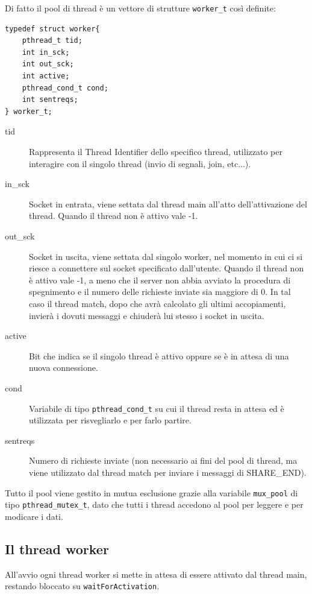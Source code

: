\documentclass[a4paper,10pt]{article}
\begin{document}
Di fatto il pool di thread \`e un vettore di strutture \texttt{worker\_t} cos\`i definite:
\begin{verbatim}
typedef struct worker{
    pthread_t tid;
    int in_sck;
    int out_sck;
    int active;
    pthread_cond_t cond;
    int sentreqs;
} worker_t;
\end{verbatim}

\begin{description}
	\item[tid] Rappresenta il Thread Identifier dello specifico thread, utilizzato per interagire con il singolo thread (invio di segnali, join, etc...).
	\item[in\_sck] Socket in entrata, viene settata dal thread main all'atto dell'attivazione del thread. Quando il thread non \`e attivo vale -1.
	\item[out\_sck] Socket in uscita, viene settata dal singolo worker, nel momento in cui ci si riesce a connettere sul socket specificato dall'utente. Quando il thread non \`e attivo vale -1, a meno che il server non abbia avviato la procedura di spegnimento e il numero delle richieste inviate sia maggiore di 0. In tal caso il thread match, dopo che avr\`a calcolato gli ultimi accopiamenti, invier\`a i dovuti messaggi e chiuder\`a lui stesso i socket in uscita.
	\item[active] Bit che indica se il singolo thread \`e attivo oppure se \`e in attesa di una nuova connessione.
	\item[cond] Variabile di tipo \texttt{pthread\_cond\_t} su cui il thread resta in attesa ed \`e utilizzata per risvegliarlo e per farlo partire.
	\item[sentreqs] Numero di richieste inviate (non necessario ai fini del pool di thread, ma viene utilizzato dal thread match per inviare i messaggi di SHARE\_END).
\end{description}

Tutto il pool viene gestito in mutua esclusione grazie alla variabile \texttt{mux\_pool} di tipo \texttt{pthread\_mutex\_t}, dato che tutti i thread accedono al pool per leggere e per modicare i dati.

\subsection{Il thread worker}

All'avvio ogni thread worker si mette in attesa di essere attivato dal thread main, restando bloccato su \texttt{waitForActivation}.
\end{document}
